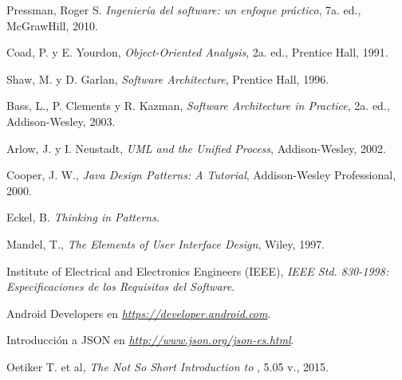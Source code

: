 \begin{thebibliography}{} %
	
	Pressman, Roger S.
	\emph{Ingeniería del software: un enfoque práctico},
	7a. ed.,
	McGrawHill,
	2010.
	
	Coad, P. y E. Yourdon, 
	\emph{Object-Oriented Analysis}, 
	2a. ed., 
	Prentice Hall, 
	1991.
	
	Shaw, M. y D. Garlan, 
	\emph{Software Architecture}, 
	Prentice Hall, 
	1996.
	
	Bass, L., P. Clements y R. Kazman, 
	\emph{Software Architecture in Practice}, 
	2a. ed., 
	Addison-Wesley, 
	2003.
	
	Arlow, J. y I. Neustadt, 
	\emph{UML and the Unified Process}, 
	Addison-Wesley, 
	2002.
	
	Cooper, J. W.,
	\emph{Java Design Patterns: A Tutorial}, 
	Addison-Wesley Professional, 
	2000.
	
	Eckel, B.
	\emph{Thinking in Patterns}.
	
	Mandel, T.,
	\emph{The Elements of User Interface Design},
	Wiley, 
	1997.
	
	Institute of Electrical and Electronics Engineers (IEEE),
	\emph{IEEE Std. 830-1998: Especificaciones de los Requisitos del Software}.
	
	Android Developers en
	\emph{\url{https://developer.android.com}}.
	
	Introducción a JSON en
	\emph{\url{http://www.json.org/json-es.html}}.
	
	Oetiker T. et al,
	\emph{The Not So Short Introduction to \LaTeXe},
	5.05 v.,
	2015.
		
\end{thebibliography}